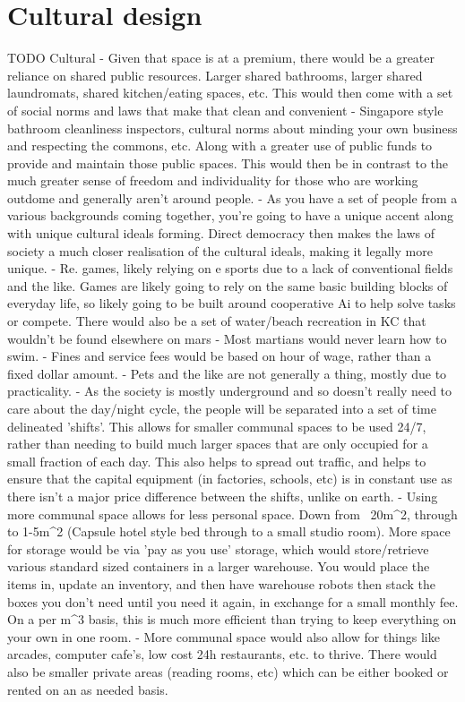 \documentclass[10pt]{article}
\begin{document}
\section*{Cultural design}
TODO Cultural - Given that space is at a premium, there would be a greater reliance on shared public resources. Larger shared bathrooms, larger shared laundromats, shared kitchen/eating spaces, etc. This would then come with a set of social norms and laws that make that clean and convenient - Singapore style bathroom cleanliness inspectors, cultural norms about minding your own business and respecting the commons, etc. Along with a greater use of public funds to provide and maintain those public spaces. This would then be in contrast to the much greater sense of freedom and individuality for those who are working outdome and generally aren't around people.
- As you have a set of people from a various backgrounds coming together, you're going to have a unique accent along with unique cultural ideals forming. Direct democracy then makes the laws of society a much closer realisation of the cultural ideals, making it legally more unique.
- Re. games, likely relying on e sports due to a lack of conventional fields and the like. Games are likely going to rely on the same basic building blocks of everyday life, so likely going to be built around cooperative Ai to help solve tasks or compete. There would also be a set of water/beach recreation in KC that wouldn't be found elsewhere on mars - Most martians would never learn how to swim.
- Fines and service fees would be based on hour of wage, rather than a fixed dollar amount.
- Pets and the like are not generally a thing, mostly due to practicality.
- As the society is mostly underground and so doesn't really need to care about the day/night cycle, the people will be separated into a set of time delineated 'shifts'. This allows for smaller communal spaces to be used 24/7, rather than needing to build much larger spaces that are only occupied for a small fraction of each day. This also helps to spread out traffic, and helps to ensure that the capital equipment (in factories, schools, etc) is in constant use as there isn't a major price difference between the shifts, unlike on earth.
- Using more communal space allows for less personal space. Down from ~20m^2, through to 1-5m^2 (Capsule hotel style bed through to a small studio room). More space for storage would be via 'pay as you use' storage, which would store/retrieve various standard sized containers in a larger warehouse. You would place the items in, update an inventory, and then have warehouse robots then stack the boxes you don't need until you need it again, in exchange for a small monthly fee. On a per m^3 basis, this is much more efficient than trying to keep everything on your own in one room.
- More communal space would also allow for things like arcades, computer cafe's, low cost 24h restaurants, etc. to thrive. There would also be smaller private areas (reading rooms, etc) which can be either booked or rented on an as needed basis.
\end{document}
